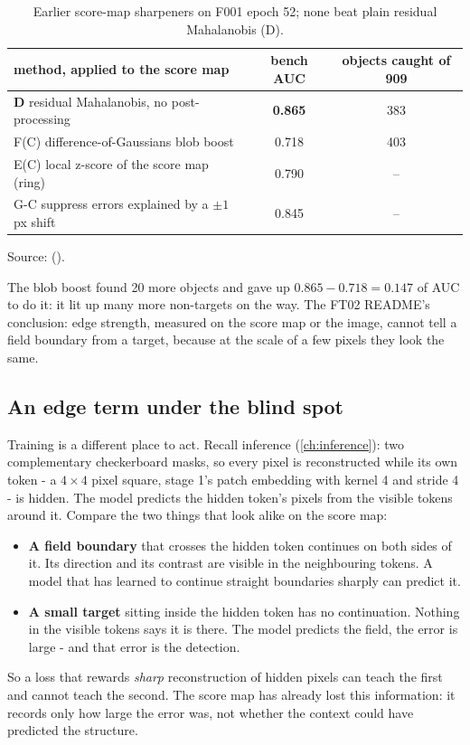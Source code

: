 \begin{table}[htbp]
\centering
\caption{Earlier score-map sharpeners on F001 epoch 52; none beat plain residual Mahalanobis (D).}
\label{tab:ftruns:postscore}
\small
\begin{tabular}{lcc}
\toprule
method, applied to the score map & bench AUC & objects caught of 909 \\
\midrule
\textbf{D} residual Mahalanobis, no post-processing & \textbf{0.865} & 383 \\
F(C) difference-of-Gaussians blob boost & 0.718 & 403 \\
E(C) local z-score of the score map (ring) & 0.790 & -- \\
G-C suppress errors explained by a $\pm 1$\,px shift & 0.845 & -- \\
\bottomrule
\end{tabular}

\smallskip
{\footnotesize Source:  ().}
\end{table}

The blob boost found 20 more objects and gave up $0.865 - 0.718 = 0.147$ of AUC to do it: it lit up many more
non-targets on the way. The FT02 README's conclusion: edge strength, measured on the score map or the image, cannot
tell a field boundary from a target, because at the scale of a few pixels they look the same.

\subsection{An edge term under the blind spot}

Training is a different place to act. Recall inference (\cref{ch:inference}): two complementary checkerboard masks,
so every pixel is reconstructed while its own token - a $4 \times 4$ pixel square, stage 1's patch embedding with
kernel 4 and stride 4 - is hidden. The model predicts the hidden token's pixels from the visible tokens around it.
Compare the two things that look alike on the score map:
\begin{itemize}
\item \textbf{A field boundary} that crosses the hidden token continues on both sides of it. Its direction and its
  contrast are visible in the neighbouring tokens. A model that has learned to continue straight boundaries sharply
  can predict it.
\item \textbf{A small target} sitting inside the hidden token has no continuation. Nothing in the visible tokens says
  it is there. The model predicts the field, the error is large - and that error is the detection.
\end{itemize}
So a loss that rewards \emph{sharp} reconstruction of hidden pixels can teach the first and cannot teach the second.
The score map has already lost this information: it records only how large the error was, not whether the context
could have predicted the structure.

